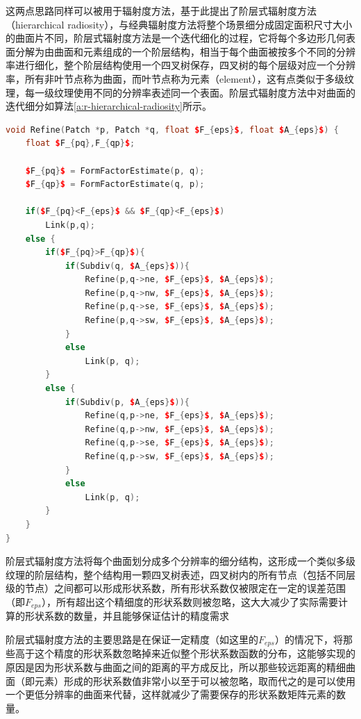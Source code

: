 这两点思路同样可以被用于辐射度方法，\cite{a:ARapidHierarchicalRadiosityAlgorithm}基于此提出了阶层式辐射度方法（hierarchical radiosity），与经典辐射度方法将整个场景细分成固定面积尺寸大小的曲面片不同，阶层式辐射度方法是一个迭代细化的过程，它将每个多边形几何表面分解为由曲面和元素组成的一个阶层结构，相当于每个曲面被按多个不同的分辨率进行细化，整个阶层结构使用一个四叉树保存，四叉树的每个层级对应一个分辨率，所有非叶节点称为曲面，而叶节点称为元素（element），这有点类似于多级纹理，每一级纹理使用不同的分辨率表述同一个表面。阶层式辐射度方法中对曲面的迭代细分如算法\ref{a:r-hierarchical-radiosity}所示。

\begin{algorithm}
\begin{lstlisting}[language=C++, mathescape]
void Refine(Patch *p, Patch *q, float $F_{eps}$, float $A_{eps}$) {
	float $F_{pq},F_{qp}$;
	
	$F_{pq}$ = FormFactorEstimate(p, q);
	$F_{qp}$ = FormFactorEstimate(q, p);
	
	if($F_{pq}<F_{eps}$ && $F_{qp}<F_{eps}$) 
		Link(p,q);
	else {
		if($F_{pq}>F_{qp}$){
			if(Subdiv(q, $A_{eps}$)){
				Refine(p,q->ne, $F_{eps}$, $A_{eps}$);
				Refine(p,q->nw, $F_{eps}$, $A_{eps}$);
				Refine(p,q->se, $F_{eps}$, $A_{eps}$);
				Refine(p,q->sw, $F_{eps}$, $A_{eps}$);
			}
			else 
				Link(p, q);
		}
		else {
			if(Subdiv(p, $A_{eps}$)){
				Refine(q,p->ne, $F_{eps}$, $A_{eps}$);
				Refine(q,p->nw, $F_{eps}$, $A_{eps}$);
				Refine(q,p->se, $F_{eps}$, $A_{eps}$);
				Refine(q,p->sw, $F_{eps}$, $A_{eps}$);
			}
			else 
				Link(p, q);
		}
	}
}
\end{lstlisting}
\caption{阶层式辐射度方法将每个曲面划分成多个分辨率的细分结构，这形成一个类似多级纹理的阶层结构，整个结构用一颗四叉树表述，四叉树内的所有节点（包括不同层级的节点）之间都可以形成形状系数，所有形状系数仅被限定在一定的误差范围（即$F_{eps}$），所有超出这个精细度的形状系数则被忽略，这大大减少了实际需要计算的形状系数的数量，并且能够保证估计的精度需求}
\label{a:r-hierarchical-radiosity}
\end{algorithm}

阶层式辐射度方法的主要思路是在保证一定精度（如这里的$F_{eps}$）的情况下，将那些高于这个精度的形状系数忽略掉来近似整个形状系数函数的分布，这能够实现的原因是因为形状系数与曲面之间的距离的平方成反比，所以那些较远距离的精细曲面（即元素）形成的形状系数值非常小以至于可以被忽略，取而代之的是可以使用一个更低分辨率的曲面来代替，这样就减少了需要保存的形状系数矩阵元素的数量。

